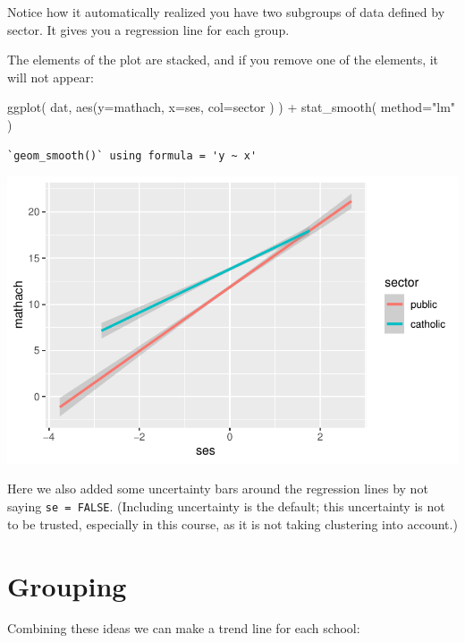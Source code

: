 \documentclass[
  letterpaper,
  DIV=11,
  numbers=noendperiod]{scrreprt}
\newenvironment{Shaded}{}{}
\newcommand{\AttributeTok}[1]{\textcolor[rgb]{0.49,0.56,0.16}{#1}}
\newcommand{\FunctionTok}[1]{\textcolor[rgb]{0.02,0.16,0.49}{#1}}
\newcommand{\NormalTok}[1]{#1}
\newcommand{\SpecialCharTok}[1]{\textcolor[rgb]{0.25,0.44,0.63}{#1}}
\newcommand{\StringTok}[1]{\textcolor[rgb]{0.25,0.44,0.63}{#1}}
\begin{document}
Notice how it automatically realized you have two subgroups of data
defined by sector. It gives you a regression line for each group.

The elements of the plot are stacked, and if you remove one of the
elements, it will not appear:

\begin{Shaded}
\begin{Highlighting}[]
\FunctionTok{ggplot}\NormalTok{( dat, }\FunctionTok{aes}\NormalTok{(}\AttributeTok{y=}\NormalTok{mathach, }\AttributeTok{x=}\NormalTok{ses, }\AttributeTok{col=}\NormalTok{sector ) ) }\SpecialCharTok{+} 
  \FunctionTok{stat\_smooth}\NormalTok{( }\AttributeTok{method=}\StringTok{"lm"}\NormalTok{ )}
\end{Highlighting}
\end{Shaded}

\begin{verbatim}
`geom_smooth()` using formula = 'y ~ x'
\end{verbatim}

\includegraphics{intro_ggplot_files/figure-pdf/unnamed-chunk-5-1.pdf}

Here we also added some uncertainty bars around the regression lines by
not saying \texttt{se\ =\ FALSE}. (Including uncertainty is the default;
this uncertainty is not to be trusted, especially in this course, as it
is not taking clustering into account.)

\section{Grouping}\label{grouping}

Combining these ideas we can make a trend line for each school:
\end{document}

